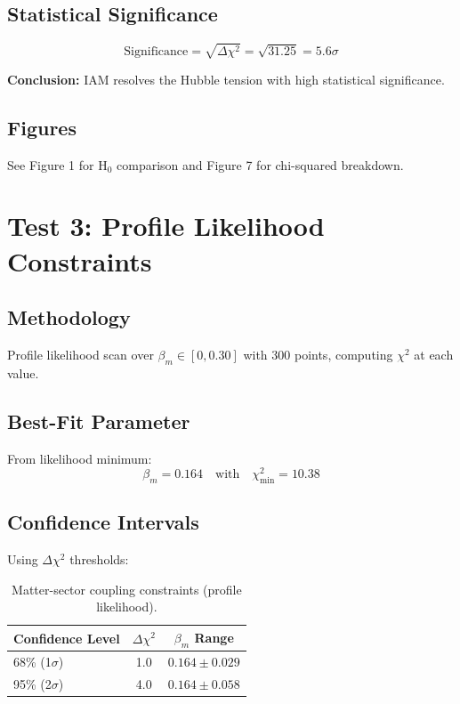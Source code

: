 \documentclass[11pt,letterpaper]{article}
\begin{document}
\subsection{Statistical Significance}

\begin{equation}
\text{Significance} = \sqrt{\Delta\chi^2} = \sqrt{31.25} = 5.6\sigma
\end{equation}

\noindent\textbf{Conclusion:} IAM resolves the Hubble tension with high statistical significance.

\subsection{Figures}

See Figure 1 for H$_0$ comparison and Figure 7 for chi-squared breakdown.

\section{Test 3: Profile Likelihood Constraints}

\subsection{Methodology}

Profile likelihood scan over $\beta_m \in [0, 0.30]$ with 300 points, computing $\chi^2$ at each value.

\subsection{Best-Fit Parameter}

From likelihood minimum:
\begin{equation}
\beta_m = 0.164 \quad \text{with} \quad \chi^2_{\min} = 10.38
\end{equation}

\subsection{Confidence Intervals}

Using $\Delta\chi^2$ thresholds:

\begin{table}[h]
\centering
\begin{tabular}{lcc}
\toprule
Confidence Level & $\Delta\chi^2$ & $\beta_m$ Range \\
\midrule
68\% (1$\sigma$) & 1.0 & $0.164 \pm 0.029$ \\
95\% (2$\sigma$) & 4.0 & $0.164 \pm 0.058$ \\
\bottomrule
\end{tabular}
\caption{Matter-sector coupling constraints (profile likelihood).}
\end{table}
\end{document}
